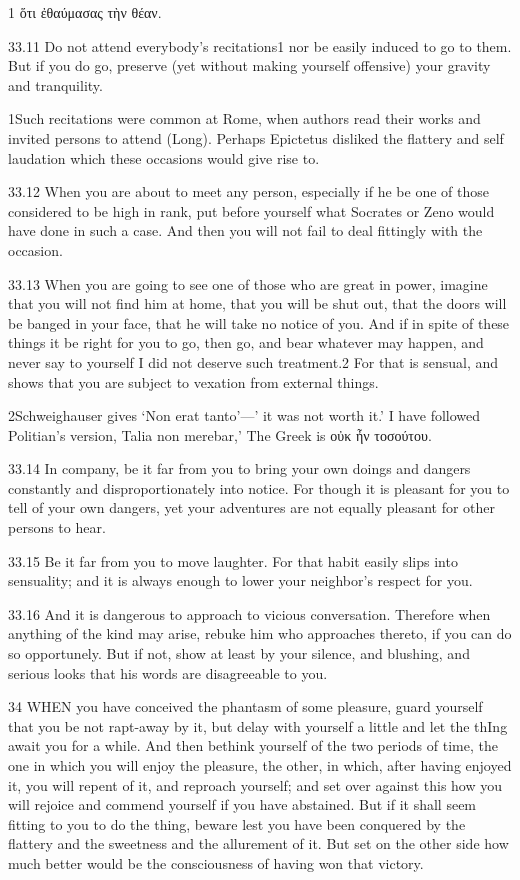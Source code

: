    1 ὅτι ἐθαύμασας τὴν θέαν.

   33.11   Do not attend everybody’s recitations1 nor be easily induced to go to them. But if you do go, preserve (yet without making yourself offensive) your gravity and tranquility.

   1Such recitations were common at Rome, when authors read their works and invited persons to attend (Long). Perhaps Epictetus disliked the flattery and self laudation which these occasions would give rise to.  

   33.12   When you are about to meet any person, especially if he be one of those considered to be high in rank, put before yourself what Socrates or Zeno would have done in such a case. And then you will not fail to deal fittingly with the occasion.

   33.13   When you are going to see one of those who are great in power, imagine that you will not find him at home, that you will be shut out, that the doors will be banged in your face, that he will take no notice of you. And if in spite of these things it be right for you to go, then go, and bear whatever may happen, and never say to yourself I did not deserve such treatment.2  For that is sensual, and shows that you are subject to vexation from external things.

   2Schweighauser gives ‘Non erat tanto’—’ it was not worth it.’ I have followed Politian’s version, Talia non merebar,’ The Greek is οὐκ ἦν τοσούτου.

   33.14   In company, be it far from you to bring your own doings and dangers constantly and disproportionately into notice. For though it is pleasant for you to tell of your own dangers, yet your adventures are not equally pleasant for other persons to hear.

   33.15   Be it far from you to move laughter. For that habit easily slips into sensuality; and it is always enough to lower your neighbor's respect for you.

   33.16   And it is dangerous to approach to vicious conversation. Therefore when anything of the kind may arise, rebuke him who approaches thereto, if you can do so opportunely. But if not, show at least by your silence, and blushing, and serious looks that his words are disagreeable to you.

   34   WHEN you have conceived the phantasm of some pleasure, guard yourself that you be not rapt-away by it, but delay with yourself a little and let the thIng await you for a while. And then bethink yourself of the two periods of time, the one in which you will enjoy the pleasure, the other, in which, after having enjoyed it, you will repent of it, and reproach yourself; and set over against this how you will rejoice and commend yourself if you have abstained. But if it shall seem fitting to you to do the thing, beware lest you have been conquered by the flattery and the sweetness and the allurement of it. But set on the other side how much better would be the consciousness of having won that victory.


